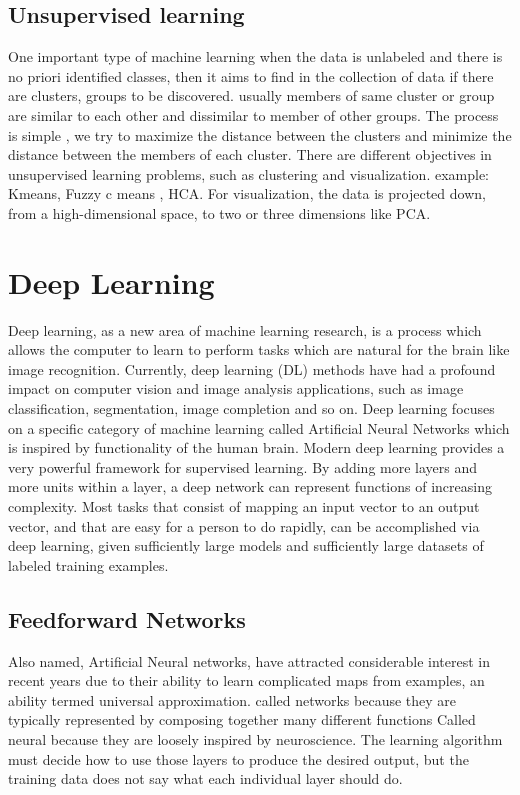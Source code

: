 \subsection{Unsupervised learning}
One important type of machine learning when the data is unlabeled and there is
no priori identified classes, then it aims to find in the collection of data if there are
clusters, groups to be discovered. usually members of same cluster or group are similar
to each other and dissimilar to member of other groups. The process is simple , we try
to maximize the distance between the clusters and minimize the distance between the
members of each cluster.
There are different objectives in unsupervised learning problems, such as clustering and
visualization. example: Kmeans, Fuzzy c means , HCA. For visualization, the data is
projected down, from a high-dimensional space, to two or three dimensions like PCA.\cite{leg}
\subsubsection{}
\section{Deep Learning}
Deep learning, as a new area of machine learning research, is a process which allows the computer to learn to perform tasks which are natural for the brain like image recognition. Currently, deep learning (DL) methods have had a profound impact on computer vision and image analysis applications, such as image classification, segmentation, image completion and so on. Deep learning focuses on a specific category of machine learning called Artificial Neural Networks which is inspired by functionality of the human brain. Modern deep learning provides a very powerful framework for supervised learning. By adding more layers and more units within a layer, a deep network can represent functions of increasing complexity. Most tasks that consist of mapping an input vector to an output vector, and that are easy for a person to do rapidly, can be accomplished via deep learning, given sufficiently large models and sufficiently large datasets of labeled training examples. \cite{art20}
\subsection{Feedforward Networks}
Also named, Artificial Neural networks, have attracted considerable interest in recent
years due to their ability to learn complicated maps from examples, an ability termed
universal approximation. called networks because they are typically represented by
composing together many different functions
Called neural because they are loosely inspired by neuroscience. \cite{art20}
The learning algorithm must decide how to use those layers to produce the desired
output, but the training data does not say what each individual layer should do.
